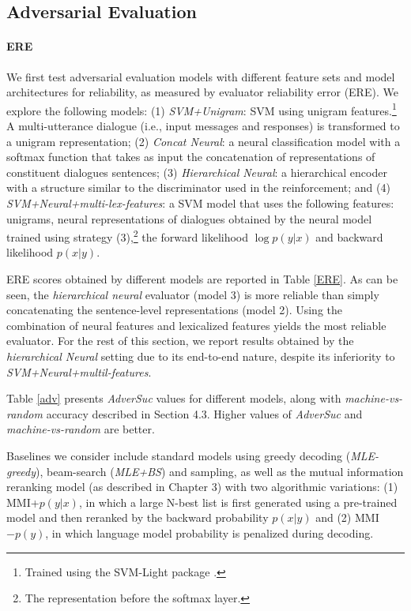 \subsection{Adversarial Evaluation}
\paragraph{ERE} We first test 
 adversarial evaluation models with different 
 feature sets and 
 model architectures for reliability, as measured by evaluator reliability error (ERE).
 We explore the following models:
   (1) {\it SVM+Unigram}:  SVM using unigram features.\footnote{Trained using the SVM-Light package \cite{joachims2002learning}.}
 A multi-utterance dialogue (i.e., input messages and responses) is transformed to a unigram representation; (2) 
{\it Concat Neural}: 
a neural classification model with 
a softmax function that takes as input the concatenation of representations of constituent dialogues sentences;
 (3) {\it Hierarchical Neural}: 
  a hierarchical encoder    
  with a  structure similar to the discriminator used in the reinforcement; and
  (4) 
  {\it SVM+Neural+multi-lex-features}: 
  a SVM model that uses the following features: unigrams,  neural representations of dialogues obtained by the neural model trained using strategy (3),\footnote{The representation before the softmax layer.} the forward likelihood $\log p(y|x)$ and backward likelihood $p(x|y)$.

ERE scores obtained by different models are reported in Table \ref{ERE}. 
As can be seen, the {\it hierarchical neural} evaluator (model 3) is more reliable than simply concatenating the sentence-level representations (model 2).
Using the combination of neural features and lexicalized features yields the most reliable evaluator. 
For the rest of this section, we report results obtained 
by the 
{\it hierarchical Neural} setting due to its end-to-end nature, despite its inferiority to {\it SVM+Neural+multil-features}. 

Table \ref{adv} presents
 {\it AdverSuc} values for different models, along with {\it machine-vs-random} accuracy described in Section 4.3. 
Higher values of  {\it AdverSuc}  and  {\it machine-vs-random} are better. 

Baselines we consider include standard \sts models using greedy decoding ({\it MLE-greedy}), beam-search ({\it MLE+BS}) and sampling, as well as the 
mutual information reranking model (as described in Chapter 3) with two algorithmic variations: (1) MMI+$p(y|x)$, in which a large N-best list is first generated using a pre-trained \sts model and then reranked by the backward probability $p(x|y)$ and (2) MMI$-p(y)$, in which language model probability is penalized during decoding. 

